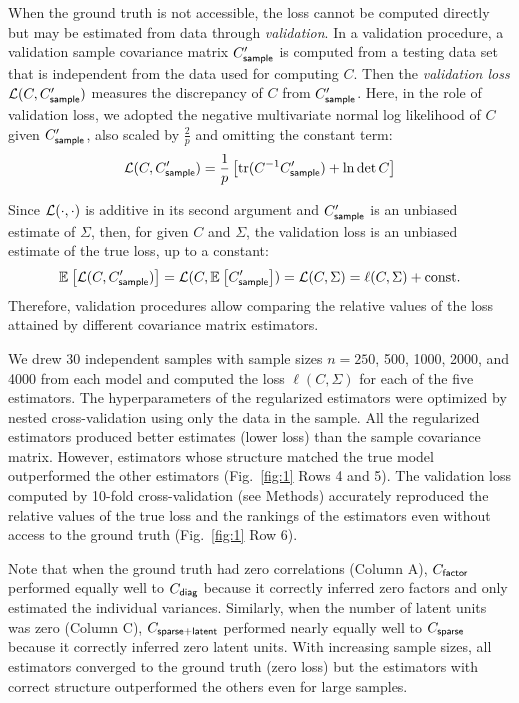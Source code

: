 When the ground truth is not accessible, the loss cannot be computed directly but may be estimated from data through \emph{validation}.
In a validation procedure, a validation sample covariance matrix $C_{\sf sample}^\prime$ is computed from a testing data set that is independent from the data used for computing $C$.
Then the \emph{validation loss} $\mathcal L(C,C^\prime_{\sf sample})$ measures the discrepancy of $C$ from $C^\prime_{\sf sample}$. 
Here, in the role of validation loss, we adopted the negative multivariate normal log likelihood of $C$ given $C^\prime_{\sf sample}$, also scaled by $\frac 2 p$ and omitting the constant term: 
\begin{equation}\label{eq:vloss}
    \mathcal L(C,C^\prime_{\sf sample}) = \frac 1 p \left[\operatorname{tr}(C^{-1}C^\prime_{\sf sample})+\ln\det C \right]
\end{equation}

Since $\mathcal L(\cdot,\cdot)$ is additive in its second argument and $C^\prime_{\sf sample}$ is an unbiased estimate of $\Sigma$, then, for given $C$ and $\Sigma$, the validation loss is an unbiased estimate of the true loss, up to a constant:
\begin{equation}
    \mathbb E_{}\left[ \mathcal L(C,C_{\sf sample}^\prime)\right]=\mathcal L(C,\mathbb E_{}\left[ C_{\sf sample}^\prime\right])=\mathcal L(C,\Sigma) = \ell(C,\Sigma) + \mbox{const}.
\end{equation}
Therefore, validation procedures allow comparing the relative values of the loss attained by different covariance matrix estimators.

We drew 30 independent samples with sample sizes $n=250$, 500, 1000, 2000, and 4000 from each model and computed the loss $\ell(C,\Sigma)$ for each of the five estimators.  
The hyperparameters of the regularized estimators were optimized by nested cross-validation using only the data in the sample.  
All the regularized estimators produced better estimates (lower loss) than the sample covariance matrix.  
However, estimators whose structure matched the true model outperformed the other estimators (Fig.~\ref{fig:1} Rows 4 and 5).
The validation loss computed by 10-fold cross-validation (see Methods) accurately reproduced the relative values of the true loss and the rankings of the estimators even without access to the ground truth (Fig.~\ref{fig:1} Row 6). 

Note that when the ground truth had zero correlations (Column A), $C_{\sf factor}$ performed equally well to $C_{\sf diag}$ because it correctly inferred zero factors and only estimated the individual variances. 
Similarly, when the number of latent units was zero (Column C), $C_{\sf sparse+latent}$ performed nearly equally well to $C_{\sf sparse}$ because it correctly inferred zero latent units.
With increasing sample sizes, all estimators converged to the ground truth (zero loss) but the estimators with correct structure outperformed the others even for large samples.

